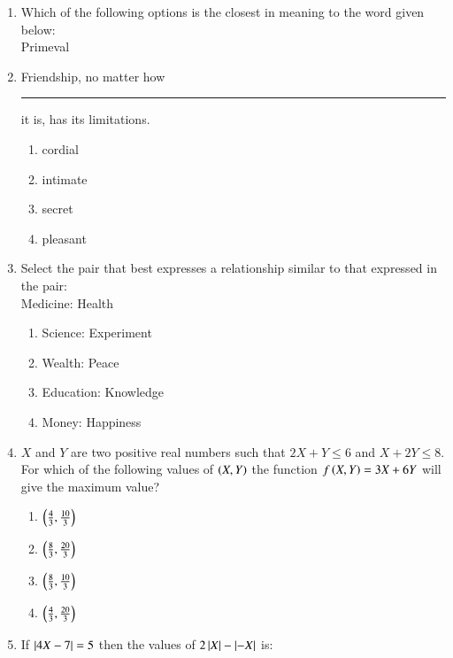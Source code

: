 \documentclass[journal,12pt,onecolumn]{IEEEtran}
\theoremstyle{remark}
\begin{document}
\begin{enumerate}
\begin{enumerate}
\end{enumerate}
\item Which of the following options is the closest in meaning to the word given below:\\
Primeval
\begin{enumerate}
\end{enumerate}
\item Friendship, no matter how \rule{3cm}{0.15mm} it is, has its limitations.
\begin{enumerate}
\item cordial
\item intimate
\item secret
\item pleasant
\end{enumerate}
\item Select the pair that best expresses a relationship similar to that expressed in the pair:\\
Medicine: Health
\begin{enumerate}
\item Science: Experiment
\item Wealth: Peace
\item Education: Knowledge
\item Money: Happiness
\end{enumerate}
\item $X$ and $Y$ are two positive real numbers such that $2X + Y \leq 6$ and $X + 2Y \leq 8$. For which of the following values  of $\left(X,Y\right)$ the function $f\left(X,Y\right) = 3X + 6Y$ will give the maximum value?
\begin{enumerate}
\item $\left(\frac{4}{3},\frac{10}{3}\right)$
\item $\left(\frac{8}{3},\frac{20}{3}\right)$
\item $\left(\frac{8}{3},\frac{10}{3}\right)$
\item $\left(\frac{4}{3},\frac{20}{3}\right)$
\end{enumerate}
\item If $\left\vert4X-7\right\vert = 5$ then the values of $2\left\vert X\right\vert-\left\vert-X\right\vert$ is:

\end{enumerate}
\end{document}

